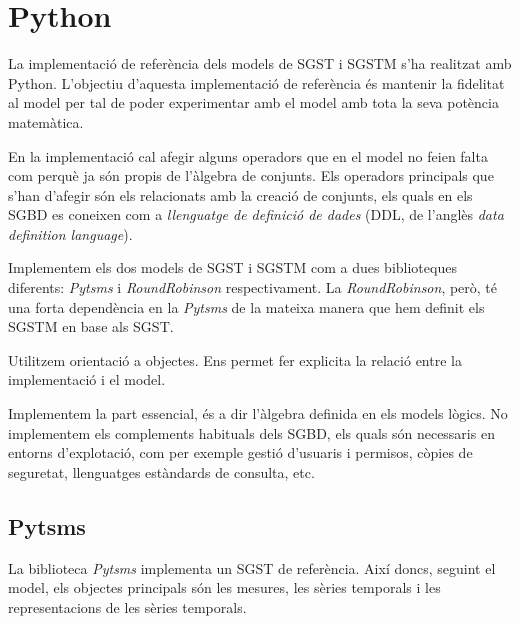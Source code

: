 

\chapter{Python}


La implementació de referència dels models de SGST i SGSTM s'ha
realitzat amb Python. L'objectiu d'aquesta implementació de referència és mantenir la fidelitat al model per tal de poder experimentar amb el model amb tota la seva potència matemàtica. 

En la implementació cal afegir alguns operadors que en el model no
feien falta com perquè ja són propis de l'àlgebra de conjunts. Els
operadors principals que s'han d'afegir són els relacionats amb la
creació de conjunts, els quals en els SGBD es coneixen com a
\emph{llenguatge de definició de dades} (DDL, de l'anglès \emph{data
  definition language}).


Implementem els dos models de SGST i SGSTM com a dues biblioteques
diferents: \emph{Pytsms} i \emph{RoundRobinson} respectivament. La
\emph{RoundRobinson}, però, té una forta dependència en la
\emph{Pytsms} de la mateixa manera que hem definit els SGSTM en base
als SGST.


Utilitzem orientació a objectes. Ens permet fer explicita la relació entre la implementació i el model.



Implementem la part essencial, és a dir l'àlgebra definida en els
models lògics. No implementem els complements habituals dels SGBD, els
quals són necessaris en entorns d'explotació, com per exemple gestió
d'usuaris i permisos, còpies de seguretat, llenguatges estàndards de
consulta, etc.




\section{Pytsms}

La biblioteca \emph{Pytsms} implementa un SGST de referència. Així
doncs, seguint el model, els objectes principals són les mesures, les
sèries temporals i les representacions de les sèries temporals.




